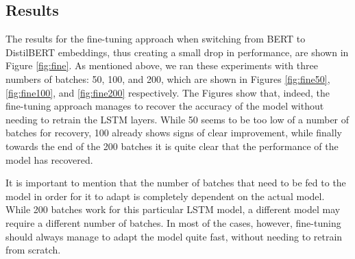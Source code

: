 \documentclass[12pt]{extreport}
\begin{document}
\subsection{Results}

The results for the fine-tuning approach when switching from BERT to DistilBERT embeddings, thus creating a small drop in performance, are shown in Figure \ref{fig:fine}. As mentioned above, we ran these experiments with three numbers of batches: 50, 100, and 200, which are shown in Figures \ref{fig:fine50}, \ref{fig:fine100}, and \ref{fig:fine200} respectively. The Figures show that, indeed, the fine-tuning approach manages to recover the accuracy of the model without needing to retrain the LSTM layers. While 50 seems to be too low of a number of batches for recovery, 100 already shows signs of clear improvement, while finally towards the end of the 200 batches it is quite clear that the performance of the model has recovered.

It is important to mention that the number of batches that need to be fed to the model in order for it to adapt is completely dependent on the actual model. While 200 batches work for this particular LSTM model, a different model may require a different number of batches. In most of the cases, however, fine-tuning should always manage to adapt the model quite fast, without needing to retrain from scratch.
\end{document}
